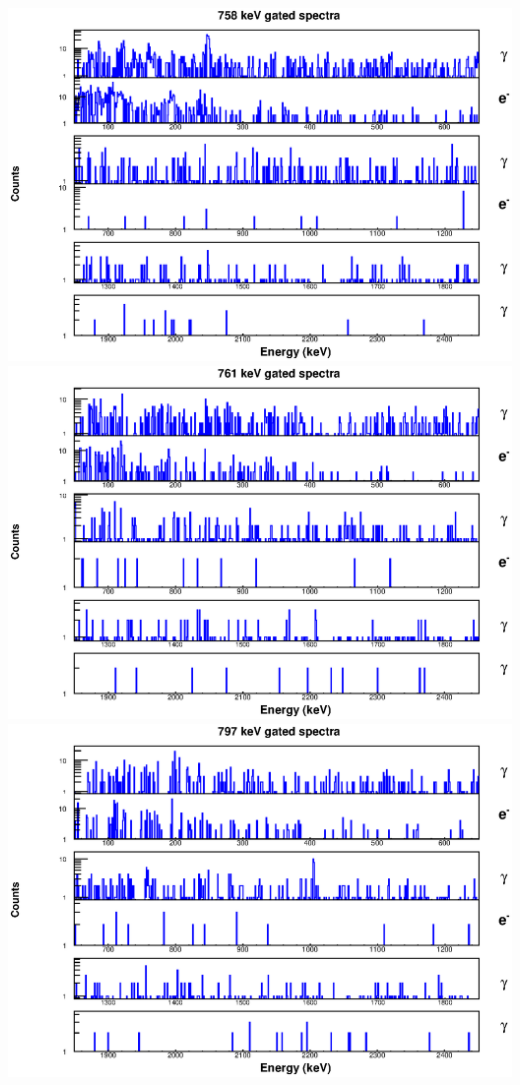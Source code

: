 \begin{landscape}
\includegraphics[scale=1.1]{154Gd_Appendix/758_combined.eps}
\includegraphics[scale=1.1]{154Gd_Appendix/761_combined.eps}
\includegraphics[scale=1.1]{154Gd_Appendix/797_combined.eps}

\end{landscape}

